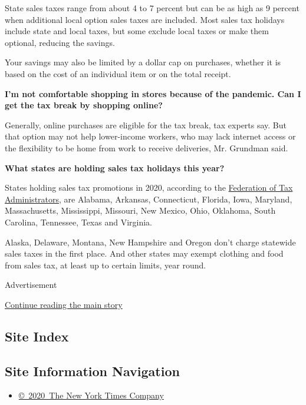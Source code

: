 State sales taxes range from about 4 to 7 percent but can be as high as
9 percent when additional local option sales taxes are included. Most
sales tax holidays include state and local taxes, but some exclude local
taxes or make them optional, reducing the savings.

Your savings may also be limited by a dollar cap on purchases, whether
it is based on the cost of an individual item or on the total receipt.

\textbf{I'm not comfortable shopping in stores because of the pandemic.
Can I get the tax break by shopping online?}

Generally, online purchases are eligible for the tax break, tax experts
say. But that option may not help lower-income workers, who may lack
internet access or the flexibility to be home from work to receive
deliveries, Mr. Grundman said.

\textbf{What states are holding sales tax holidays this year?}

States holding sales tax promotions in 2020, according to the
\href{https://www.taxadmin.org/2020-sales-tax-holiday}{Federation of Tax
Administrators}, are Alabama, Arkansas, Connecticut, Florida, Iowa,
Maryland, Massachusetts, Mississippi, Missouri, New Mexico, Ohio,
Oklahoma, South Carolina, Tennessee, Texas and Virginia.

Alaska, Delaware, Montana, New Hampshire and Oregon don't charge
statewide sales taxes in the first place. And other states may exempt
clothing and food from sales tax, at least up to certain limits, year
round.

Advertisement

\protect\hyperlink{after-bottom}{Continue reading the main story}

\hypertarget{site-index}{%
\subsection{Site Index}\label{site-index}}

\hypertarget{site-information-navigation}{%
\subsection{Site Information
Navigation}\label{site-information-navigation}}

\begin{itemize}
\tightlist
\item
  \href{https://help.nytimes3xbfgragh.onion/hc/en-us/articles/115014792127-Copyright-notice}{©~2020~The
  New York Times Company}
\end{itemize}

